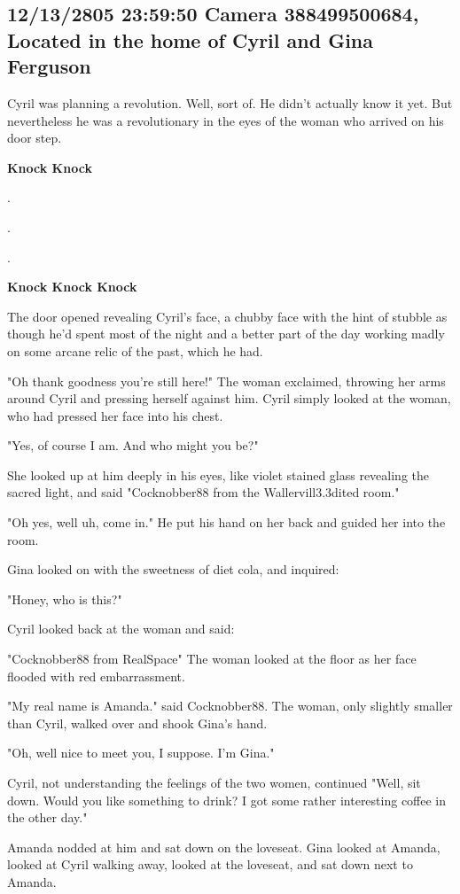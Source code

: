 \documentclass[12pt]{article}
\begin{document}
\subsection*{12/13/2805 23:59:50 Camera 388499500684, Located in the home of Cyril and Gina Ferguson}
\label{sec:orge9e9c04}

Cyril was planning a revolution. Well, sort of. He didn't actually know it yet. But nevertheless he was a revolutionary in the eyes of the woman who arrived on his door step.

\textbf{Knock Knock}

.

.

.

\textbf{Knock Knock Knock}

The door opened revealing Cyril's face, a chubby face with the hint of stubble as though he'd spent most of the night and a better part of the day working madly on some arcane relic of the past, which he had. 

"Oh thank goodness you're still here!" The woman exclaimed, throwing her arms around Cyril and pressing herself against him. Cyril simply looked at the woman, who had pressed her face into his chest.

"Yes, of course I am. And who might you be?"

She looked up at him deeply in his eyes, like violet stained glass revealing the sacred light, and said "Cocknobber88 from the Wallervill3.3dited room."

"Oh yes, well uh, come in." He put his hand on her back and guided her into the room.

Gina looked on with the sweetness of diet cola, and inquired:

"Honey, who is this?"

Cyril looked back at the woman and said:

"Cocknobber88 from RealSpace" The woman looked at the floor as her face flooded with red embarrassment.

"My real name is Amanda." said Cocknobber88. The woman, only slightly smaller than Cyril, walked over and shook Gina's hand.

"Oh, well nice to meet you, I suppose. I'm Gina."

Cyril, not understanding the feelings of the two women, continued "Well, sit down. Would you like something to drink? I got some rather interesting coffee in the other day." 

Amanda nodded at him and sat down on the loveseat. Gina looked at Amanda, looked at Cyril walking away, looked at the loveseat, and sat down next to Amanda.
\end{document}
